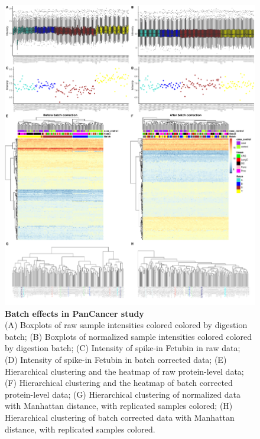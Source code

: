 \documentclass[num-refs]{wiley-article}
\begin{document}
\begin{figure}
	\includegraphics[width=\textwidth]{figures/Supp_Fig2_PanCancer}
	
	\caption{\textbf{Batch effects in PanCancer study} \\
		\footnotesize (A) Boxplots of raw sample intensities colored colored by digestion batch; (B) Boxplots of normalized sample intensities colored colored by digestion batch; 
		(C) Intensity of spike-in Fetubin in raw data; (D) Intensity of spike-in Fetubin in batch corrected data; (E) Hierarchical clustering and the heatmap of raw protein-level data; (F) Hierarchical clustering and the heatmap of batch corrected protein-level data; (G) Hierarchical clustering of normalized data with Manhattan distance, with replicated samples colored; (H) Hierarchical clustering of batch corrected data with Manhattan distance, with replicated samples colored.}
	\label{fig:batch_figS2_PanCancer}
\end{figure}
\end{document}
